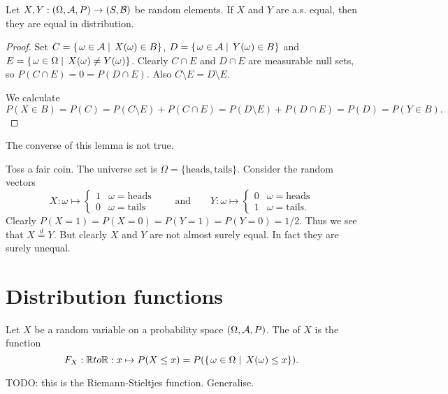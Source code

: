 \begin{lemma}
Let $X, Y: \left( \Omega, \mathcal{A}, P \right) \to \left( S, \mathcal{B} \right)$ be random elements. If $X$ and $Y$ are a.s. equal, then they are equal in distribution.
\end{lemma}
\begin{proof}
Set $C = \left\{\left. \omega\in \mathcal{A} \;\right|\; X(\omega)\in B \right\}$, $D = \left\{\left. \omega\in \mathcal{A} \;\right|\; Y(\omega)\in B \right\}$ and $E = \left\{\left. \omega\in \Omega \;\right|\; X(\omega)\neq Y(\omega) \right\}$. Clearly $C\cap E$ and $D\cap E$ are measurable null sets, so $P(C\cap E) = 0 = P(D\cap E)$. Also $C\setminus E = D\setminus E$.

We calculate
\[ P(X\in B) = P(C) = P(C\setminus E) +P(C\cap E) = P(D\setminus E) +P(D\cap E) = P(D) = P(Y\in B). \]
\end{proof}
The converse of this lemma is not true.
\begin{example}
Toss a fair coin. The universe set is $\Omega = \{\text{heads}, \text{tails}\}$. Consider the random vectors
\[ X: \omega \mapsto \begin{cases}
1 & \omega = \text{heads} \\ 0 & \omega = \text{tails}
\end{cases} \qquad\text{and}\qquad  Y: \omega \mapsto \begin{cases}
0 & \omega = \text{heads} \\ 1 & \omega = \text{tails}.
\end{cases} \]
Clearly $P(X = 1) = P(X = 0) = P(Y = 1) = P(Y = 0) = 1/2$. Thus we see that $X \overset{d}{=} Y$. But clearly $X$ and $Y$ are not almost surely equal. In fact they are surely unequal.
\end{example}

\section{Distribution functions}
\begin{definition}
Let $X$ be a random variable on a probability space $\left( \Omega, \mathcal{A}, P \right)$. The  of $X$ is the function
\[ F_X: \mathbb{R} to \mathbb{R}: x\mapsto P(X \leq x) = P(\left\{\left. \omega\in \Omega \;\right|\; X(\omega) \leq x \right\}). \]
\end{definition}

TODO: this is the Riemann-Stieltjes function. Generalise.

